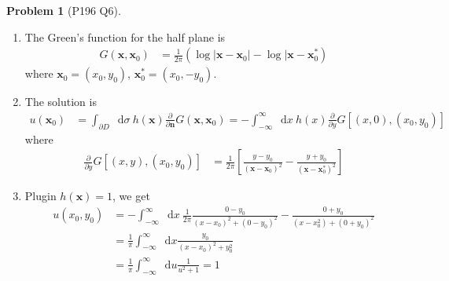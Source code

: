 \documentclass[twoside,11pt]{article}
\renewcommand*\d{\mathop{}\!\mathrm{d}}
\theoremstyle{definition}
\newtheorem{problem}{Problem}
\theoremstyle{remark}
\begin{document}
\begin{problem}[P196 Q6]\
\begin{enumerate}[label=(\alph*)]
\item The Green's function for the half plane is
\begin{align*}
    G(\mathbf{x}, \mathbf{x}_0) &= 
    \frac{1}{2\pi}(
        \log|\mathbf{x}-\mathbf{x}_0|
        - \log|\mathbf{x}-\mathbf{x}_0^*
    )
\end{align*}
where $\mathbf{x}_0=(x_0, y_0)$, $\mathbf{x}_0^*=(x_0, -y_0)$.

\item The solution is
\begin{align*}
    u(\mathbf{x}_0) &= 
    \int_{\partial D}\d\sigma\ h(\mathbf{x})\frac{\partial }{\partial\mathbf{n}}
    G(\mathbf{x}, \mathbf{x}_0)
    = -\int_{-\infty}^\infty\d x\ h(x)\frac{\partial}{\partial y}
    G[(x, 0), (x_0, y_0)]
\end{align*}
where
\begin{align*}
    \frac{\partial}{\partial y}G[(x, y), (x_0, y_0)] &= 
    \frac{1}{2\pi}\left[
        \frac{y-y_0}{(\mathbf{x}-\mathbf{x}_0)^2}
        -\frac{y+y_0}{(\mathbf{x}-\mathbf{x}_0^*)^2}
    \right]
\end{align*}

\item Plugin $h(\mathbf{x}) = 1$, we get
\begin{align*}
    u(x_0, y_0) &= 
    -\int_{-\infty}^\infty\d x\ \frac{1}{2\pi}
    \frac{0-y_0}{(x-x_0)^2+(0-y_0)^2}
    - \frac{0+y_0}{(x-x_0^2)+(0+y_0)^2}\\
    &= \frac{1}{\pi}\int_{-\infty}^\infty
    \d x\frac{y_0}{(x-x_0)^2 + y_0^2}\\
    &= \frac{1}{\pi}\int_{-\infty}^\infty\d u \frac{1}{u^2 + 1} = 1
\end{align*}

\end{enumerate}
\end{problem}



\end{document}
